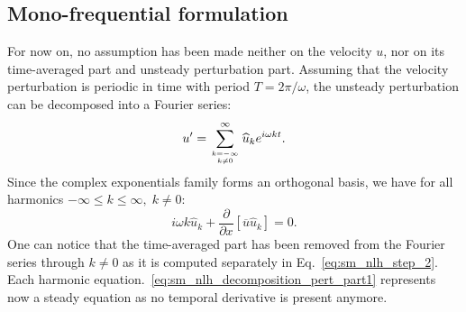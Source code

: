 \subsection{Mono-frequential formulation}
For now on, no assumption has been made neither on the velocity $u$,
nor on its time-averaged part and unsteady perturbation part.
Assuming that the velocity perturbation 
is periodic in time with period
$T=2 \pi / \omega$,
the unsteady perturbation can be decomposed into 
a Fourier series:
\begin{equation}
	u^\prime = \sum_{k=-\infty \atop k \neq 0}^{\infty} 
	\widehat{u}_k e^{i \omega k t}.
	\label{eq:sm_nlh_decomposition_pert}
\end{equation}
Since the complex exponentials family forms 
an orthogonal basis, we have for all harmonics 
$-\infty \leq k \leq \infty, \; k \neq 0$:
\begin{equation}
	i \omega k \widehat{u}_k + 
	\frac{\partial}{\partial x} \left[ \overline{u} \widehat{u}_k\right] =
	0.
	\label{eq:sm_nlh_decomposition_pert_part1}
\end{equation}
One can notice that the time-averaged part has been removed from
the Fourier series through $k \neq 0$ as it is computed 
separately in Eq.~\eqref{eq:sm_nlh_step_2}.
Each harmonic equation.~\eqref{eq:sm_nlh_decomposition_pert_part1}
represents now a steady equation as no temporal
derivative is present anymore.

